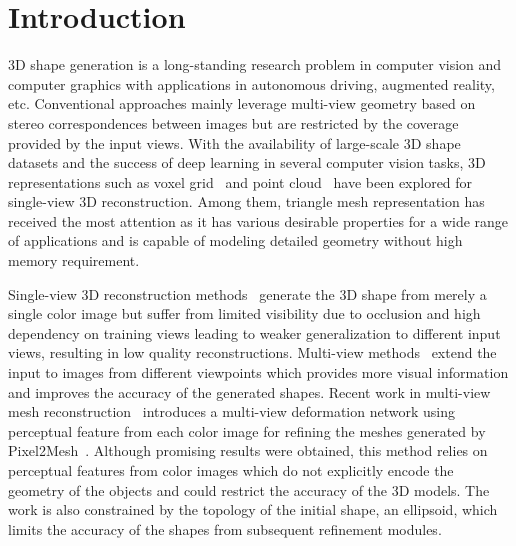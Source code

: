 \section{Introduction}

3D shape generation is a long-standing research problem in computer vision and computer graphics with applications in autonomous driving, augmented reality, etc. Conventional approaches mainly leverage multi-view geometry based on stereo correspondences between images but are restricted by the coverage provided by the input views. With the availability of large-scale 3D shape datasets and the success of deep learning in several computer vision tasks, 3D representations such as voxel grid~\cite{3dr2n2, tulsiani2017multi, yan2016perspective} and point cloud~\cite{yang2018foldingnet, fan2017point} have been explored for single-view 3D reconstruction.
Among them, triangle mesh representation has received the most attention as it has various desirable properties for a wide range of applications and is capable of modeling detailed geometry without high memory requirement.

Single-view 3D reconstruction methods~\cite{wang2018pixel2mesh,huang2015single,kar2015category,su2014estimating} generate the 3D shape from merely a single color image but suffer from limited visibility due to occlusion and high dependency on training views leading to weaker generalization to different input views, resulting in low quality reconstructions.
Multi-view methods~\cite{wen2019pixel2mesh++,3dr2n2,kar2017lsm,mcrecon2017} extend the input to images from different viewpoints which provides more visual information and improves the accuracy of the generated shapes.
Recent work in multi-view mesh reconstruction~\cite{wen2019pixel2mesh++} introduces a multi-view deformation network using perceptual feature from each color image for refining the meshes generated by Pixel2Mesh~\cite{wang2018pixel2mesh}.
Although promising results were obtained, this method relies on perceptual features from color images which do not explicitly encode the geometry of the objects and could restrict the accuracy of the 3D models.
The work is also constrained by the topology of the initial shape, an ellipsoid, which limits the accuracy of the shapes from subsequent refinement modules.

